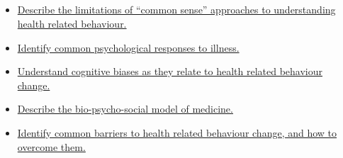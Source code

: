 \documentclass[10pt, a4paper]{article}
\newcommand{\MYhref}[3][blue]{\href{#2}{\color{#1}{#3}}}%
\begin{document}
\subsection{\MYhref[melbBlue]{https://notion.so/9eff15067e914a4f8316346c4895201d}{Psychological Drivers of Health}} \begin{itemize} \item \href{https://www.notion.so/2013a66f51a545249a2e1872212d3aad}{Describe the limitations of “common sense” approaches to understanding health related behaviour.} \item \href{https://www.notion.so/5a00a657772d4412aba34fc8eb12b4f3}{Identify common psychological responses to illness.} \item \href{https://www.notion.so/11a5c030244a458ab3ac2c5f65795f8b}{Understand cognitive biases as they relate to health related behaviour change.} \item \href{https://www.notion.so/e109ca172dc1486e9221acfd7e5b5a91}{Describe the bio-psycho-social model of medicine.} \item \href{https://www.notion.so/f4f3eb1d25fe46a2b6ef648257384718}{Identify common barriers to health related behaviour change, and how to overcome them.} \end{itemize}
\end{document}
